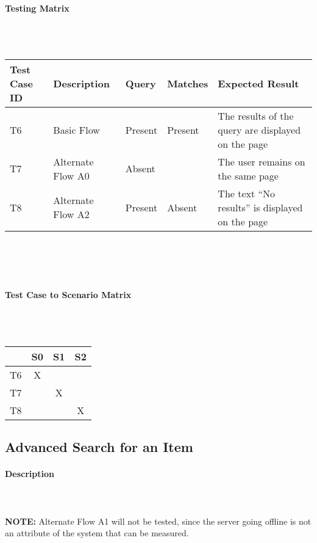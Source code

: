 \documentclass{article}
\begin{document}
\paragraph{Testing Matrix}~\\ \\
\begin{tabular}{ p{0.5in}  p{1.9in}  p{0.4in}  p{0.7in}  p{2in} }
\hline
Test Case ID & Description & Query & Matches & Expected Result\\
\hline
\hline
T6 & Basic Flow & Present & Present & The results of the query are displayed on the page\\
\hline
T7 & Alternate Flow A0 & Absent & & The user remains on the same page\\
\hline
T8 & Alternate Flow A2 & Present & Absent & The text ``No results'' is displayed on the page\\
\hline
\end{tabular}\\
~\\
~\\
\paragraph{Test Case to Scenario Matrix}~\\ \\
\begin{tabular}{ | c || c | c | c | }
\hline
    & S0 & S1 & S2 \\
\hline
\hline
T6 & X  &    &    \\
\hline
T7 &    & X  &    \\
\hline
T8 &    &    & X  \\
\hline
\end{tabular}


\subsection{Advanced Search for an Item}
\paragraph{Description}
~\\ \\
\textbf{NOTE:} Alternate Flow A1 will not be tested, since the server going offline is not an attribute of the system that can be measured.
\end{document}
